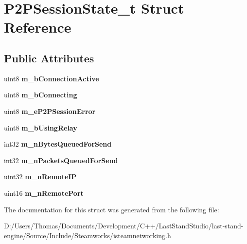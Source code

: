 \hypertarget{structP2PSessionState__t}{}\section{P2\+P\+Session\+State\+\_\+t Struct Reference}
\label{structP2PSessionState__t}
\subsection*{Public Attributes}
\begin{DoxyCompactItemize}
\item 
\hypertarget{structP2PSessionState__t_a13d30aa6ad8ed4de7316242ea792eeed}{}uint8 {\bfseries m\+\_\+b\+Connection\+Active}\label{structP2PSessionState__t_a13d30aa6ad8ed4de7316242ea792eeed}

\item 
\hypertarget{structP2PSessionState__t_affe29b1777fff94aa1cf028741a2291c}{}uint8 {\bfseries m\+\_\+b\+Connecting}\label{structP2PSessionState__t_affe29b1777fff94aa1cf028741a2291c}

\item 
\hypertarget{structP2PSessionState__t_a8c7ec149d8803d7f5a84c4b93ff0ba6b}{}uint8 {\bfseries m\+\_\+e\+P2\+P\+Session\+Error}\label{structP2PSessionState__t_a8c7ec149d8803d7f5a84c4b93ff0ba6b}

\item 
\hypertarget{structP2PSessionState__t_a6aa759dbf5d5b96615ee0b077c5709ae}{}uint8 {\bfseries m\+\_\+b\+Using\+Relay}\label{structP2PSessionState__t_a6aa759dbf5d5b96615ee0b077c5709ae}

\item 
\hypertarget{structP2PSessionState__t_a62eef33b75a38846e86478dc67e3d03b}{}int32 {\bfseries m\+\_\+n\+Bytes\+Queued\+For\+Send}\label{structP2PSessionState__t_a62eef33b75a38846e86478dc67e3d03b}

\item 
\hypertarget{structP2PSessionState__t_a63c1f6689b04fdf1f3e6679ef1d6c64f}{}int32 {\bfseries m\+\_\+n\+Packets\+Queued\+For\+Send}\label{structP2PSessionState__t_a63c1f6689b04fdf1f3e6679ef1d6c64f}

\item 
\hypertarget{structP2PSessionState__t_a69ac05c4479bdac20ad8dad84170dd46}{}uint32 {\bfseries m\+\_\+n\+Remote\+I\+P}\label{structP2PSessionState__t_a69ac05c4479bdac20ad8dad84170dd46}

\item 
\hypertarget{structP2PSessionState__t_a2130179acb60d3e9a8753a278ebff627}{}uint16 {\bfseries m\+\_\+n\+Remote\+Port}\label{structP2PSessionState__t_a2130179acb60d3e9a8753a278ebff627}

\end{DoxyCompactItemize}


The documentation for this struct was generated from the following file\+:\begin{DoxyCompactItemize}
\item 
D\+:/\+Users/\+Thomas/\+Documents/\+Development/\+C++/\+Last\+Stand\+Studio/last-\/stand-\/engine/\+Source/\+Include/\+Steamworks/isteamnetworking.\+h\end{DoxyCompactItemize}
